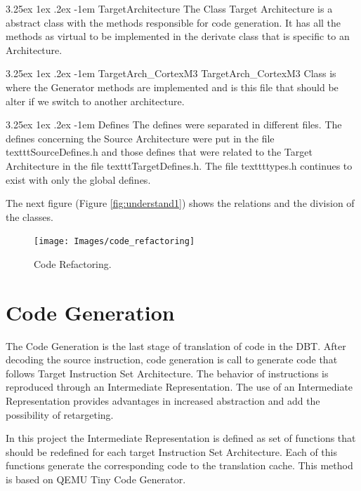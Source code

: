 \documentclass{report}
\makeatletter
\renewcommand\paragraph{\@startsection{paragraph}{5}{\z@}%
	{3.25ex \@plus1ex \@minus.2ex}%
	{-1em}%
	{\normalfont\normalsize\bfseries}}
\makeatother
\begin{document}
	\paragraph{TargetArchitecture}
	The Class Target Architecture is a abstract class with the methods responsible for code generation. It has all the methods as virtual to be implemented in the derivate class that is specific to an Architecture.
	
	\paragraph{TargetArch\_CortexM3}
	TargetArch\_CortexM3 Class is where the Generator methods are implemented and is this file that should be alter if we switch to another architecture.  
	
	\paragraph{Defines}
	The defines were separated in different files. The defines concerning the Source Architecture were put in the file texttt{SourceDefines.h} and those defines that were related to the Target Architecture in the file texttt{TargetDefines.h}. The file texttt{types.h} continues to exist with only the global defines.
	
	The next figure (Figure \ref{fig:understand1}) shows the relations and the division of the classes.
	
	\begin{figure} [H]
		\centering
		\texttt{[image: Images/code\_refactoring]}
		\caption{Code Refactoring.}
		\label{fig:refactoring}
	\end{figure}	
	
	
	\section{Code Generation}
	The Code Generation is the last stage of translation of code in the DBT. After decoding the source instruction, code generation is call to generate code that follows Target Instruction Set Architecture. The behavior of instructions is reproduced through an Intermediate Representation. The use of an Intermediate Representation provides advantages in increased abstraction and add the possibility of retargeting.
	
	In this project the Intermediate Representation is defined as set of functions that should be redefined for each target Instruction Set Architecture. Each of this functions generate the corresponding code to the translation cache. This method is based on QEMU Tiny Code Generator.
	
\end{document}
